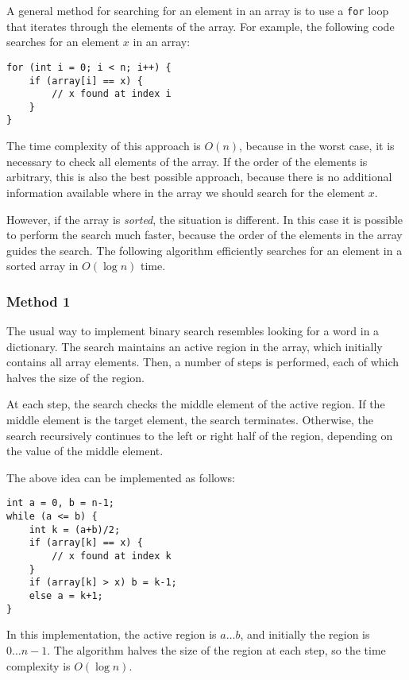 A general method for searching for an element
in an array is to use a \texttt{for} loop
that iterates through the elements of the array.
For example, the following code searches for
an element $x$ in an array:

\begin{lstlisting}
for (int i = 0; i < n; i++) {
    if (array[i] == x) {
        // x found at index i
    }
}
\end{lstlisting}

The time complexity of this approach is $O(n)$,
because in the worst case, it is necessary to check
all elements of the array.
If the order of the elements is arbitrary,
this is also the best possible approach, because
there is no additional information available where
in the array we should search for the element $x$.

However, if the array is \emph{sorted},
the situation is different.
In this case it is possible to perform the
search much faster, because the order of the
elements in the array guides the search.
The following  algorithm
efficiently searches for an element in a sorted array
in $O(\log n)$ time.

\subsubsection{Method 1}

The usual way to implement binary search
resembles looking for a word in a dictionary.
The search maintains an active region in the array,
which initially contains all array elements.
Then, a number of steps is performed,
each of which halves the size of the region.

At each step, the search checks the middle element
of the active region.
If the middle element is the target element,
the search terminates.
Otherwise, the search recursively continues
to the left or right half of the region,
depending on the value of the middle element.

The above idea can be implemented as follows:
\begin{lstlisting}
int a = 0, b = n-1;
while (a <= b) {
    int k = (a+b)/2;
    if (array[k] == x) {
        // x found at index k
    }
    if (array[k] > x) b = k-1;
    else a = k+1;
}
\end{lstlisting}

In this implementation, the active region is $a \ldots b$,
and initially the region is $0 \ldots n-1$.
The algorithm halves the size of the region at each step,
so the time complexity is $O(\log n)$.

